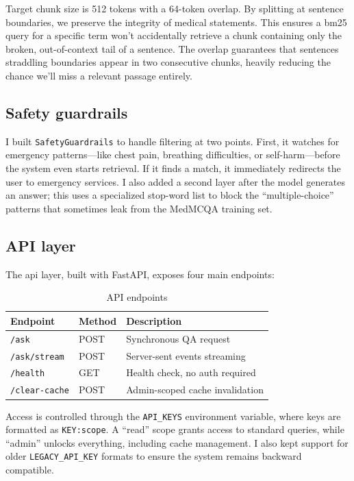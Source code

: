 Target chunk size is 512 tokens with a 64-token overlap. By splitting at sentence boundaries, we preserve the integrity of medical statements. This ensures a \ac{bm25} query for a specific term won't accidentally retrieve a chunk containing only the broken, out-of-context tail of a sentence. The overlap guarantees that sentences straddling boundaries appear in two consecutive chunks, heavily reducing the chance we'll miss a relevant passage entirely.

\subsection{Safety guardrails}

I built \texttt{SafetyGuardrails} to handle filtering at two points. First, it watches for emergency patterns---like chest pain, breathing difficulties, or self-harm---before the system even starts retrieval. If it finds a match, it immediately redirects the user to emergency services. I also added a second layer after the model generates an answer; this uses a specialized stop-word list to block the ``multiple-choice'' patterns that sometimes leak from the MedMCQA training set.

\subsection{API layer}

The \ac{api} layer, built with FastAPI, exposes four main endpoints:

\begin{table}[htbp]
\centering
\caption{API endpoints}
\renewcommand{\arraystretch}{1.3}
\begin{tabular}{|l|l|l|}
\hline
\textbf{Endpoint} & \textbf{Method} & \textbf{Description} \\
\hline
\texttt{/ask} & POST & Synchronous QA request \\
\texttt{/ask/stream} & POST & Server-sent events streaming \\
\texttt{/health} & GET & Health check, no auth required \\
\texttt{/clear-cache} & POST & Admin-scoped cache invalidation \\
\hline
\end{tabular}
\end{table}

Access is controlled through the \texttt{API\_KEYS} environment variable, where keys are formatted as \texttt{KEY:scope}. A ``read'' scope grants access to standard queries, while ``admin'' unlocks everything, including cache management. I also kept support for older \texttt{LEGACY\_API\_KEY} formats to ensure the system remains backward compatible.
